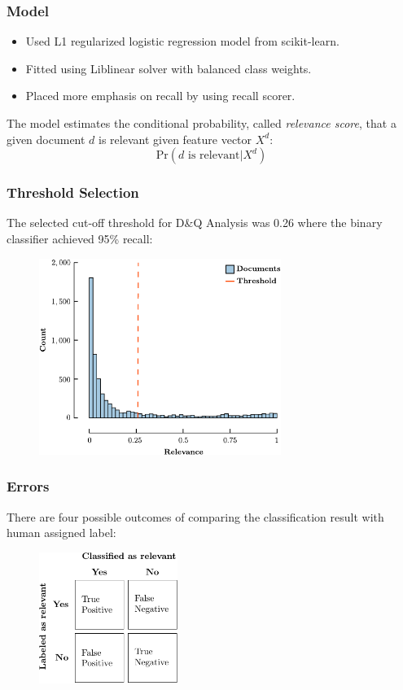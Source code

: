 \documentclass[10pt, xcolor={dvipsnames}]{beamer}
\begin{document}
\begin{frame}
\frametitle{Model}
\begin{itemize}
\item Used L1 regularized logistic regression model from scikit-learn.
\item Fitted using Liblinear solver with balanced class weights. 
\item Placed more emphasis on recall by using recall scorer.
\end{itemize}
\begin{definition}[Relevance]
The model estimates the conditional probability, called {\it relevance score}, that a given document $d$ is relevant given feature vector $X^{d}$:
$$
\text{Pr}(\text{$d$ is relevant} | X^{d})
$$
\end{definition}
\end{frame}

\begin{frame}
\frametitle{Threshold Selection}
The selected cut-off threshold for D\&Q Analysis was 0.26 where the binary classifier achieved 95\% recall:

\begin{figure}[H]
\centering
\includegraphics[width=0.7\textwidth]{../report/figures/threshold-selection/threshold-selection-crop.pdf}
\end{figure}
\end{frame}

\begin{frame}
\frametitle{Errors}
There are four possible outcomes of comparing the classification result with human assigned label:
\begin{figure}[H]
\centering
\includegraphics[width=0.4\textwidth]{../report/tables/confusion-matrix/confusion-matrix-crop.pdf}
\end{figure}
\end{frame}
\end{document}
